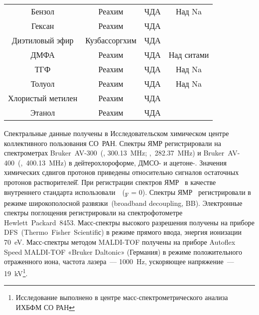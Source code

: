 \begin{table}[h!]
\begin{small}
\begin{tabular}{cccc}
            Бензол                & Реахим                 & ЧДА              & Над Na              \\
            Гексан                & Реахим                 & ЧДА              &                     \\
            Диэтиловый эфир       & Кузбассоргхим          & ЧДА              &                     \\
            ДМФА                  & Реахим                 & ЧДА              & Над ситами          \\
            ТГФ                   & Реахим                 & ЧДА              & Над Na              \\
            Толуол                & Реахим                 & ЧДА              & Над Na              \\
            Хлористый метилен     & Реахим                 & ЧДА              &                     \\
            Этанол                & Реахим                 & ЧДА              &                     \\
            \bottomrule
        \end{tabular}
    \end{small}
\end{table}

Спектральные данные получены в Исследовательском химическом центре коллективного пользования СО~РАН.
Спектры ЯМР регистрировали на спектрометрах Bruker~AV-300~(, \SI{300.13}{\mega\hertz}; ,~\SI{282.37}{\mega\hertz}) и Bruker~AV-400~(,~\SI{400.13}{\mega\hertz}) в дейтерохлороформе, \mbox{ДМСО-} и \mbox{ацетоне-}.
Значения химических сдвигов протонов приведены относительно сигналов остаточных протонов растворителей̆.
При регистрации спектров ЯМР~ в качестве внутреннего стандарта использовали~~(\chemdelta{}\textsubscript{F} = \SI{0}{\ppm}).
Спектры ЯМР~ регистрировали в режиме широкополосной развязки~(broadband decoupling, BB).
Электронные спектры поглощения регистрировали на спектрофотометре Hewlett~Packard~8453.
Масс-спектры высокого разрешения получены на приборе DFS~(Thermo~Fisher~Scientifiс) в режиме прямого ввода, энергия ионизации \SI{70}{\electronvolt}.
Масс-спектры методом  MALDI-TOF получены на приборе Autoflex Speed MALDI-TOF «Bruker Daltonic» (Германия) в режиме положительного отраженного иона, частота лазера~–-- \SI{1000}{\hertz}, ускоряющее напряжение~–-- \SI{19}{\kilo\volt}\footnote{Исследование выполнено в центре масс-спектрометрического анализа ИХБФМ СО РАН}.



